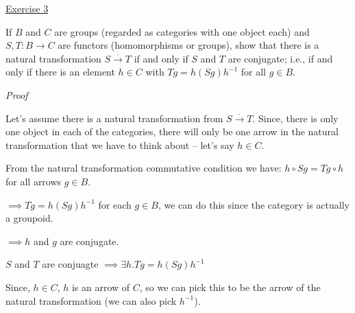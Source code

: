 \noindent
\underline{Exercise 3}
\vspace{2mm}

If $B$ and $C$ are groups (regarded as categories with one object each) and
$S, T: B \to C$ are functors (homomorphisms or groups), show that there is a
natural transformation $S \xrightarrow{.} T$ if and only if $S$ and $T$ are conjugate; i.e., if and
only if there is an element $h \in C$ with $Tg = h(Sg)h^{-1}$ for all $g \in B$.

\vspace{2mm}

\noindent
\emph{Proof}

Let's assume there is a natural transformation from $S \xrightarrow{.} T$. Since, there is only one object in each of the categories, there will only be one arrow in the natural transformation that we have to think about -- let's say $h \in C$. 

From the natural transformation commutative condition we have: $h \circ Sg = Tg \circ h$ for all arrows $g \in B$.

$ \implies Tg = h(Sg)h^{-1}$ for each $g \in B$, we can do this since the category is actually a groupoid.

$ \implies h$ and $g$ are conjugate.

$S$ and $T$ are conjuagte $\implies \exists h . Tg = h (Sg) h^{-1}$

Since, $h \in C$, $h$ is an arrow of $C$, so we can pick this to be the arrow of the natural transformation (we can also pick $h^{-1}$).

\vspace{2mm}
